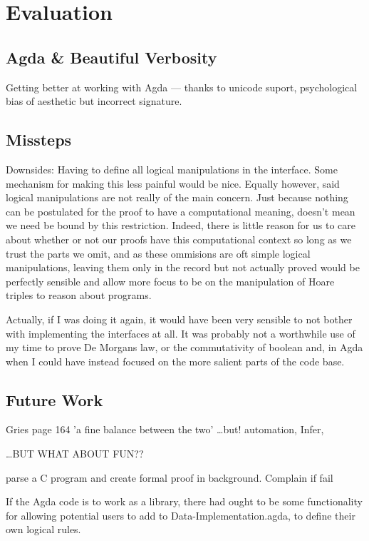 \documentclass[oneside,12pt]{article}
\begin{document}
\section{Evaluation}


\subsection{Agda \& Beautiful Verbosity}

Getting better at working with Agda --- thanks to unicode suport, psychological bias of aesthetic but incorrect signature.


\subsection{Missteps}


Downsides: Having to define all logical manipulations in the interface. Some mechanism for making this less painful would be nice. Equally however, said logical manipulations are not really of the main concern. Just because nothing can be postulated for the proof to have a computational meaning, doesn't mean we need be bound by this restriction. Indeed, there is little reason for us to care about whether or not our proofs have this computational context so long as we trust the parts we omit, and as these ommisions are oft simple logical manipulations, leaving them only in the record but not actually proved would be perfectly sensible and allow more focus to be on the manipulation of Hoare triples to reason about programs.

Actually, if I was doing it again, it would have been very sensible to not bother with implementing the interfaces at all. It was probably not a worthwhile use of my time to prove De Morgans law, or the commutativity of boolean and, in Agda when I could have instead focused on the more salient parts of the code base.

\subsection{Future Work}

Gries page 164 'a fine balance between the two' 
\ldots but! automation, Infer,

\ldots BUT WHAT ABOUT FUN??

parse a C program and create formal proof in background. Complain if fail

If the Agda code is to work as a library, there had ought to be some functionality for allowing potential users to add to Data-Implementation.agda, to define their own logical rules.
\end{document}

